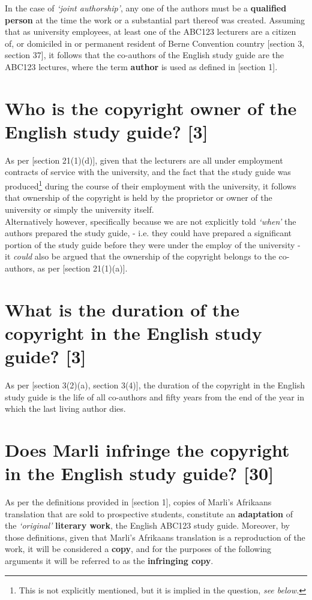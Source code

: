 \documentclass[11pt]{article}
\begin{document}
In the case of \emph{`joint authorship'}, any one of the authors must be a
\textbf{qualified person} at the time the work or a substantial part thereof
was created. Assuming that as university employees, at least one of
the ABC123 lecturers are a citizen of, or domiciled in or permanent
resident of Berne Convention country [section 3, section
37]\cite{wipo86_berne}, it follows that the co-authors of the English
study guide are the ABC123 lectures, where the term \textbf{author} is used
as defined in
[section 1]\cite{rsa78_copyrightact}.

\section{Who is the copyright owner of the English study guide? \textbf{[3]}}
\label{sec:org62c1309}

As per [section 21(1)(d)]\cite{rsa78_copyrightact}, given that the
lecturers are all under employment contracts of service with the
university, and the fact that the study guide was produced\footnote{This is
not explicitly mentioned, but it is implied in the question, \emph{see
below.}} during the course of their employment with the university, it
follows that ownership of the copyright is held by the proprietor or
owner of the university or simply the university itself.\\

Alternatively however, specifically because we are not explicitly told
\emph{`when'} the authors prepared the study guide, - i.e. they could have
prepared a significant portion of the study guide before they were
under the employ of the university - it \emph{could} also be argued that
the ownership of the copyright belongs to the co-authors, as per
[section 21(1)(a)]\cite{rsa78_copyrightact}.

\section{What is the duration of the copyright in the English study guide? \textbf{[3]}}
\label{sec:org2b97381}

As per [section 3(2)(a), section 3(4)]\cite{rsa78_copyrightact}, the
duration of the copyright in the English study guide is the life of
all co-authors and fifty years from the end of the year in which the
last living author dies.

\section{Does Marli infringe the copyright in the English study guide? \textbf{[30]}}
\label{sec:orgf72d715}
As per the definitions provided in [section 1]\cite{rsa78_copyrightact},
copies of Marli's Afrikaans translation that are sold to prospective
students, constitute an \textbf{adaptation} of the \emph{`original'} \textbf{literary
work}, the English ABC123 study guide. Moreover, by those definitions,
given that Marli's Afrikaans translation is a reproduction of the
work, it will be considered a \textbf{copy}, and for the purposes of the
following arguments it will be referred to as the \textbf{infringing copy}.\\
\end{document}

